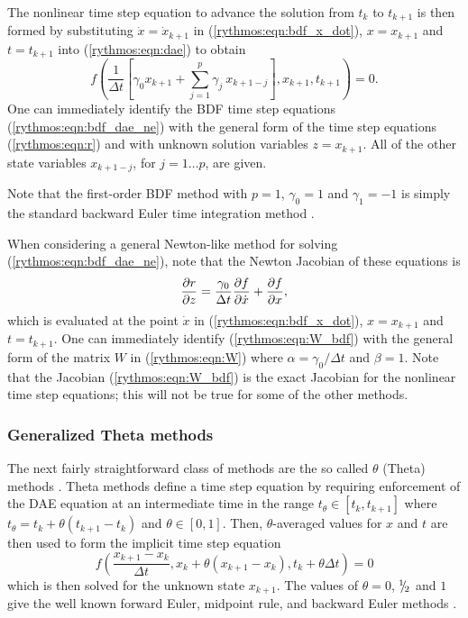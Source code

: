 \documentclass[pdf,ps2pdf,11pt]{SANDreport}
\begin{document}
The nonlinear time step equation to advance the solution from $t_k$ to
$t_{k+1}$ is then formed by substituting $\dot{x} = \dot{x}_{k+1}$ in
(\ref{rythmos:eqn:bdf_x_dot}), $x = x_{k+1}$ and $t = t_{k+1}$ into
(\ref{rythmos:eqn:dae}) to obtain
%
\begin{equation}
f\left( \frac{1}{\Delta t} \left[ \gamma_0 x_{k+1} + \sum_{j=1}^{p} \gamma_j \: x_{k+1-j} \right],x_{k+1},t_{k+1}\right) = 0.
\label{rythmos:eqn:bdf_dae_ne}
\end{equation}
%
One can immediately identify the BDF time step equations
(\ref{rythmos:eqn:bdf_dae_ne}) with the general form of the time step
equations (\ref{rythmos:eqn:r}) and with unknown solution variables $z =
x_{k+1}$.  All of the other state variables $x_{k+1-j}$, for $j = 1 {}\ldots
p$, are given.

Note that the first-order BDF method with $p=1$, $\gamma_0 = 1$ and $\gamma_1 =
-1$ is simply the standard backward Euler time integration method \cite{AscherPetzold}.

When considering a general Newton-like method for solving
(\ref{rythmos:eqn:bdf_dae_ne}), note that the Newton Jacobian of these
equations is
%
\begin{equation}
\displaystyle{\frac{\partial r}{\partial z}}
= \frac{\gamma_0}{\Delta t} \displaystyle{\frac{\partial f}{\partial \dot{x}}} + \displaystyle{\frac{\partial f}{\partial x}},
\label{rythmos:eqn:W_bdf}
\end{equation}
%
which is evaluated at the point $\dot{x}$ in (\ref{rythmos:eqn:bdf_x_dot}), $x
= x_{k+1}$ and $t = t_{k+1}$.  One can immediately identify
(\ref{rythmos:eqn:W_bdf}) with the general form of the matrix $W$ in
(\ref{rythmos:eqn:W}) where $\alpha = {}\gamma_0 / \Delta t$ and $\beta = 1$.
Note that the Jacobian (\ref{rythmos:eqn:W_bdf}) is the exact Jacobian for the
nonlinear time step equations; this will not be true for some of the other
methods.

\subsubsection{Generalized Theta methods}

The next fairly straightforward class of methods are the so called $\theta$
(Theta) methods \cite{HairerWanner}.  Theta methods define a time step
equation by requiring enforcement of the DAE equation at an intermediate time
in the range $t_{\theta} {}\in [t_k,t_{k+1}]$ where $t_{\theta} = t_k + \theta
( t_{k+1} - t_k )$ and $\theta {}\in [0,1]$.  Then, $\theta$-averaged values
for $x$ and $t$ are then used to form the implicit time step equation
%
\begin{equation}
f\left( \frac{x_{k+1} - x_{k}}{\Delta t},x_k + \theta ( x_{k+1} - x_{k} ), t_k + \theta \Delta t \right) = 0
\label{rythmos:eqn:theta_dae_ne}
\end{equation}
%
which is then solved for the unknown state $x_{k+1}$.  The values of $\theta =
0$, ${}^1 \!\! / \! {}_2$ and $1$ give the well known forward Euler, midpoint
rule, and backward Euler methods \cite{HairerWanner}.
\end{document}
